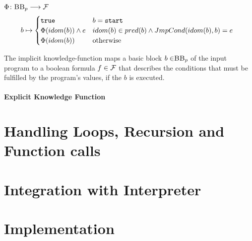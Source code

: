 
\begin{definition} 
    \begin{center}
        $\Phi\colon \mbb_p \longrightarrow \mbform$ \\
        \begin{equation*}
            b \mapsto
        \begin{cases}
            \mttt & b = \mathtt{start} \\
            \Phi(idom(b)) \land e & \parbox[t]{.6\textwidth}{$idom(b) \in pred(b) \land JmpCond(idom(b), b) = e$}\\ 
            \Phi(idom(b)) & \text{otherwise}\\ 
        \end{cases}
        \end{equation*}
    \end{center}
    The implicit knowledge-function maps a basic block $b \in \mbb_p$ of the input program \p to a boolean formula $f \in \mathcal{F}$ that describes the conditions that must be fulfilled by the program's values, if the $b$ is executed.
\end{definition}



\paragraph{Explicit Knowledge Function}


\section{Handling Loops, Recursion and Function calls}

\section{Integration with Interpreter}

\section{Implementation}